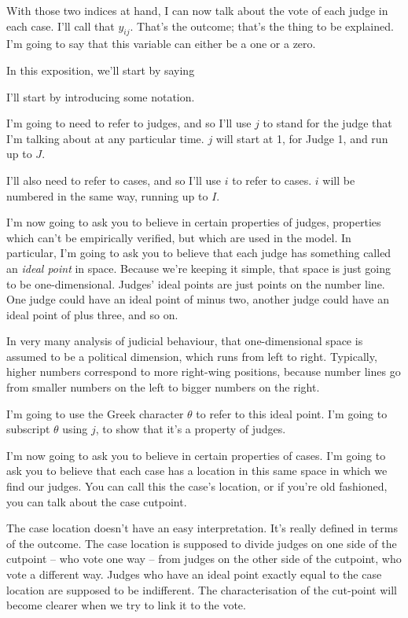\documentclass[12pt,twoside]{article}
\begin{document}
With those two indices at hand, I can now talk about the vote of each
judge in each case. I'll call that \(y_{ij}\). That's the outcome;
that's the thing to be explained. I'm going to say that this variable
can either be a one or a zero.

In this exposition, we'll start by saying

I'll start by introducing some notation.

I'm going to need to refer to judges, and so I'll use \(j\) to stand for
the judge that I'm talking about at any particular time. \(j\) will
start at 1, for Judge 1, and run up to \(J\).

I'll also need to refer to cases, and so I'll use \(i\) to refer to
cases. \(i\) will be numbered in the same way, running up to \(I\).

I'm now going to ask you to believe in certain properties of judges,
properties which can't be empirically verified, but which are used in
the model. In particular, I'm going to ask you to believe that each
judge has something called an \emph{ideal point} in space. Because we're
keeping it simple, that space is just going to be one-dimensional.
Judges' ideal points are just points on the number line. One judge could
have an ideal point of minus two, another judge could have an ideal
point of plus three, and so on.

In very many analysis of judicial behaviour, that one-dimensional space
is assumed to be a political dimension, which runs from left to right.
Typically, higher numbers correspond to more right-wing positions,
because number lines go from smaller numbers on the left to bigger
numbers on the right.

I'm going to use the Greek character \(\theta\) to refer to this ideal
point. I'm going to subscript \(\theta\) using \(j\), to show that it's
a property of judges.

I'm now going to ask you to believe in certain properties of cases. I'm
going to ask you to believe that each case has a location in this same
space in which we find our judges. You can call this the case's
location, or if you're old fashioned, you can talk about the case
cutpoint.

The case location doesn't have an easy interpretation. It's really
defined in terms of the outcome. The case location is supposed to divide
judges on one side of the cutpoint -- who vote one way -- from judges on
the other side of the cutpoint, who vote a different way. Judges who
have an ideal point exactly equal to the case location are supposed to
be indifferent. The characterisation of the cut-point will become
clearer when we try to link it to the vote.
\end{document}
